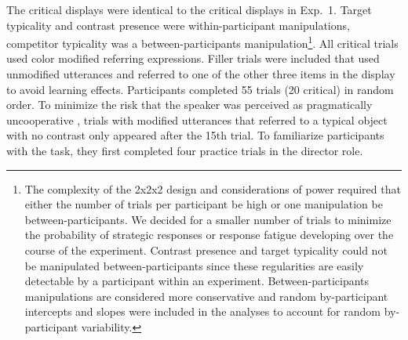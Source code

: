 \documentclass[10pt,letterpaper]{article}
\begin{document}
The critical displays were identical to the critical displays in Exp.~1. Target typicality and contrast presence were within-participant manipulations, competitor typicality was a between-participants manipulation\footnote{The complexity of the 2x2x2 design and considerations of power required that either the number of trials per participant  be high or one manipulation  be between-participants. We decided for a smaller number of trials to minimize the probability of strategic responses or response fatigue developing over the course of the experiment. Contrast presence and target typicality could not be manipulated between-participants since these regularities are easily detectable by a participant within an experiment. Between-participants manipulations are considered more conservative \cite{Charness:2012} and random by-participant intercepts and slopes were included in the analyses to account for random by-participant variability.}. All critical trials used color modified referring expressions. 
Filler trials were included that used unmodified utterances and referred to one of the other three items in the display to avoid learning effects. 
Participants completed 55 trials (20 critical) in random order. To minimize the risk that the speaker was perceived as pragmatically uncooperative \cite{Grodner:2011,Pogue:2016,Ryskin:2019}, trials with modified utterances that referred to a typical object with no contrast only appeared after the 15th trial. To familiarize participants with the task, they first completed four practice trials in the director role.
 
 


\end{document}
